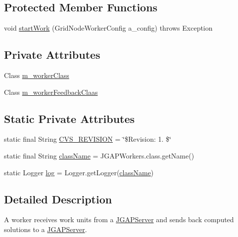 \subsection*{Protected Member Functions}
\begin{DoxyCompactItemize}
\item 
void \hyperlink{classorg_1_1jgap_1_1distr_1_1grid_1_1_j_g_a_p_workers_a0ffb23a6b7463c38c8fe71ffbd451cf8}{start\-Work} (Grid\-Node\-Worker\-Config a\-\_\-config)  throws Exception 
\end{DoxyCompactItemize}
\subsection*{Private Attributes}
\begin{DoxyCompactItemize}
\item 
Class \hyperlink{classorg_1_1jgap_1_1distr_1_1grid_1_1_j_g_a_p_workers_a0618d4fe65a2f6e989cb5649ff9576f9}{m\-\_\-worker\-Class}
\item 
Class \hyperlink{classorg_1_1jgap_1_1distr_1_1grid_1_1_j_g_a_p_workers_a1d42ad82110d1b56df8b05f29ccee27c}{m\-\_\-worker\-Feedback\-Claas}
\end{DoxyCompactItemize}
\subsection*{Static Private Attributes}
\begin{DoxyCompactItemize}
\item 
static final String \hyperlink{classorg_1_1jgap_1_1distr_1_1grid_1_1_j_g_a_p_workers_aeb1c1988740e912a98158ace610d68ed}{C\-V\-S\-\_\-\-R\-E\-V\-I\-S\-I\-O\-N} = \char`\"{}\$Revision\-: 1. \$\char`\"{}
\item 
static final String \hyperlink{classorg_1_1jgap_1_1distr_1_1grid_1_1_j_g_a_p_workers_a864578c5bf291820a0ca273991e93c47}{class\-Name} = J\-G\-A\-P\-Workers.\-class.\-get\-Name()
\item 
static Logger \hyperlink{classorg_1_1jgap_1_1distr_1_1grid_1_1_j_g_a_p_workers_a5f6bcf7484fb1867a587776b8581b6d2}{log} = Logger.\-get\-Logger(\hyperlink{classorg_1_1jgap_1_1distr_1_1grid_1_1_j_g_a_p_workers_a864578c5bf291820a0ca273991e93c47}{class\-Name})
\end{DoxyCompactItemize}


\subsection{Detailed Description}
A worker receives work units from a \hyperlink{classorg_1_1jgap_1_1distr_1_1grid_1_1_j_g_a_p_server}{J\-G\-A\-P\-Server} and sends back computed solutions to a \hyperlink{classorg_1_1jgap_1_1distr_1_1grid_1_1_j_g_a_p_server}{J\-G\-A\-P\-Server}.

